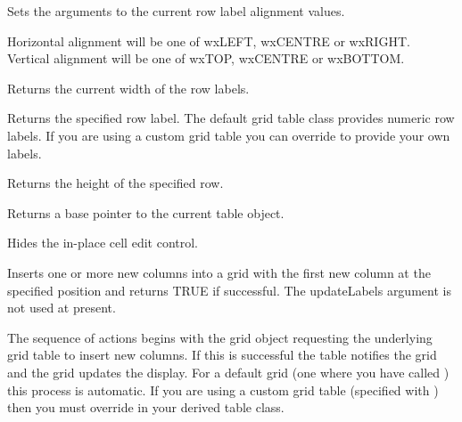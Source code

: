 Sets the arguments to the current row label alignment values.

Horizontal alignment will be one of wxLEFT, wxCENTRE or wxRIGHT. \\
Vertical alignment will be one of wxTOP, wxCENTRE or wxBOTTOM.


\label{wxgridgetrowlabelsize}


Returns the current width of the row labels.

\label{wxgridgetrowlabelvalue}


Returns the specified row label. The default grid table class provides numeric row labels.
If you are using a custom grid table you can override 
 to provide
your own labels. 

\label{wxgridgetrowsize}


Returns the height of the specified row.

\label{wxgridgettable}


Returns a base pointer to the current table object.

\label{wxgridhidecelleditcontrol}


Hides the in-place cell edit control.

\label{wxgridinsertcols}


Inserts one or more new columns into a grid with the first new column at the
specified position and returns TRUE if successful. The updateLabels argument is not
used at present. 

The sequence of actions begins with the grid object requesting the underlying grid
table to insert new columns. If this is successful the table notifies the grid and the
grid updates the display. For a default grid (one where you have called 
) this process is automatic. If you are
using a custom grid table (specified with ) 
then you must override 
 in your derived
table class.

